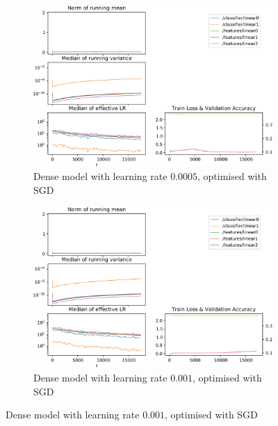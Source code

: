 \begin{figure}
    \begin{subfigure}{\textwidth}
        \centering
        \includegraphics[width=\linewidth]{gfx/diagrams/experiments/adam/fullyconnectedmodel_sgd_00005_0_-1.pdf}
        \caption{Dense model with learning rate $0.0005$, optimised with SGD}
    \end{subfigure}

    \begin{subfigure}{\textwidth}
        \centering
        \includegraphics[width=\linewidth]{gfx/diagrams/experiments/adam/fullyconnectedmodel_sgd_0001_0_-1.pdf}
        \caption{Dense model with learning rate $0.001$, optimised with SGD}
    \end{subfigure}


\end{figure}
